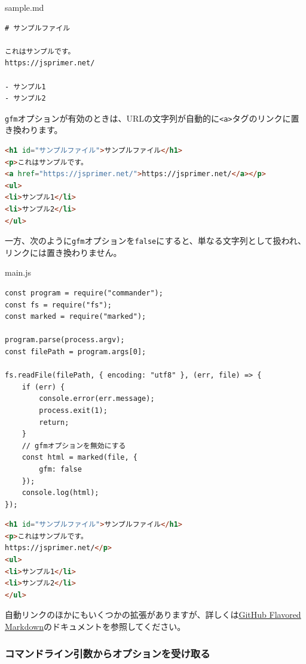 \begin{listtitle}
sample.md
\end{listtitle}
\begin{lstlisting}
# サンプルファイル

これはサンプルです。
https://jsprimer.net/

- サンプル1
- サンプル2
\end{lstlisting}
\listend

\texttt{gfm}オプションが有効のときは、URLの文字列が自動的に\texttt{<a>}タグのリンクに置き換わります。

\begin{lstlisting}[language=HTML]
<h1 id="サンプルファイル">サンプルファイル</h1>
<p>これはサンプルです。
<a href="https://jsprimer.net/">https://jsprimer.net/</a></p>
<ul>
<li>サンプル1</li>
<li>サンプル2</li>
</ul>
\end{lstlisting}

一方、次のように\texttt{gfm}オプションを\texttt{false}にすると、単なる文字列として扱われ、リンクには置き換わりません。

\begin{listtitle}
main.js
\end{listtitle}
\begin{lstlisting}
const program = require("commander");
const fs = require("fs");
const marked = require("marked");

program.parse(process.argv);
const filePath = program.args[0];

fs.readFile(filePath, { encoding: "utf8" }, (err, file) => {
    if (err) {
        console.error(err.message);
        process.exit(1);
        return;
    }
    // gfmオプションを無効にする
    const html = marked(file, {
        gfm: false
    });
    console.log(html);
});
\end{lstlisting}
\listend

\begin{lstlisting}[language=HTML]
<h1 id="サンプルファイル">サンプルファイル</h1>
<p>これはサンプルです。
https://jsprimer.net/</p>
<ul>
<li>サンプル1</li>
<li>サンプル2</li>
</ul>
\end{lstlisting}

自動リンクのほかにもいくつかの拡張がありますが、詳しくは\href{https://github.github.com/gfm/}{GitHub
Flavored Markdown}のドキュメントを参照してください。

\hypertarget{receive-option}{%
\subsubsection{コマンドライン引数からオプションを受け取る}\label{receive-option}}

